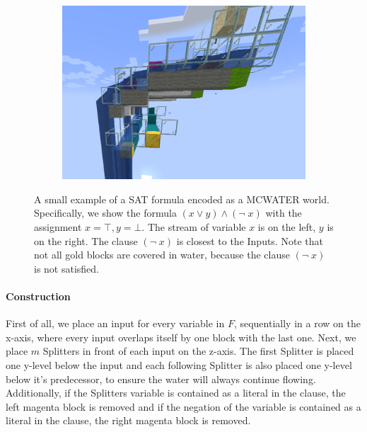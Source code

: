 \begin{figure}[h]
\begin{subfigure}{.33\textwidth}
\end{subfigure}
\begin{subfigure}{.33\textwidth}
  \centering
  \includegraphics[width=.9\linewidth]{images/small_example_side.png}
\end{subfigure}
\caption{A small example of a SAT formula encoded as a MCWATER world. Specifically, we show the formula $(x \vee y) \wedge (\neg \; x)$ with the assignment $x = \top, y = \bot$. The stream of variable $x$ is on the left, $y$ is on the right. The clause $(\neg \; x)$ is closest to the Inputs. Note that not all gold blocks are covered in water, because the clause $(\neg \; x)$ is not satisfied.}
\label{fig:small-example}
\end{figure}



\paragraph{Construction} \label{npcomplete:construction}
First of all, we place an input for every variable in $F$, sequentially in a row on the x-axis, where every input overlaps itself by one block with the last one.
\newline\noindent Next, we place $m$ Splitters in front of each input on the z-axis. The first Splitter is placed one y-level below the input and each following Splitter is also placed one y-level below it's predecessor, to ensure the water will always continue flowing. Additionally, if the Splitters variable is contained  as a literal in the clause, the left magenta block is removed and if the negation of the variable is contained  as a literal in the clause, the right magenta block is removed.
\linebreak


